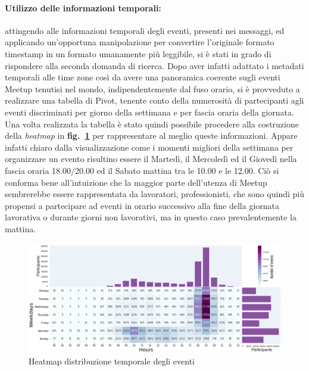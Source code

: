 \documentclass[fleqn,10pt]{SelfArx} %
\begin{document}
{\paragraph{Utilizzo delle informazioni temporali:}
attingendo alle informazioni temporali degli eventi, presenti nei messaggi, ed applicando un'opportuna manipolazione per convertire l'originale formato timestamp in un formato umanamente più leggibile, si è stati in grado di rispondere alla seconda domanda di ricerca. 
Dopo aver infatti adattato i metadati temporali alle time zone così da avere una panoramica coerente sugli eventi Meetup tenutisi nel mondo, indipendentemente dal fuso orario, si è provveduto a realizzare una tabella di Pivot, tenente conto della numerosità di partecipanti agli eventi discriminati per giorno della settimana e per fascia oraria della giornata. 
Una volta realizzata la tabella è stato quindi possibile procedere alla costruzione della \textit{heatmap} in \textbf{fig.~\ref{plot_heatmap}} 
per rappresentare al meglio queste informazioni. 
Appare infatti chiaro dalla visualizzazione come i momenti migliori della settimana per organizzare un evento risultino essere il Martedì, il Mercoledì ed il Giovedì nella fascia oraria 18.00/20.00 ed il Sabato mattina tra le 10.00 e le 12.00. 
Ciò si conforma bene all'intuizione che la maggior parte dell'utenza di Meetup sembrerebbe essere rappresentata da lavoratori, professionisti, che sono quindi più propensi a partecipare ad eventi in orario successivo alla fine della giornata lavorativa o durante giorni non lavorativi, ma in questo caso prevalentemente la mattina.
\begin{figure}
\centering
\includegraphics[width = 9.2 cm, height = 5 cm]{heatmap_with_barplot_v3.jpg}
\vspace*{0.01cm}
\caption{\footnotesize \label{plot_heatmap} Heatmap distribuzione temporale degli eventi}
\end{figure}
}
\end{document}

